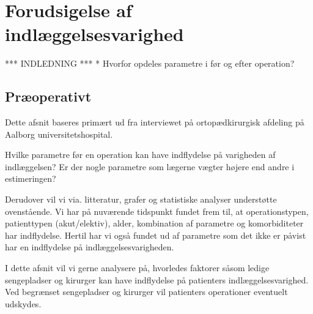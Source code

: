 \section{Forudsigelse af indlæggelsesvarighed}

*** INDLEDNING ***
* Hvorfor opdeles parametre i før og efter operation?

\subsection{Præoperativt}

Dette afsnit baseres primært ud fra interviewet på ortopædkirurgisk afdeling på Aalborg universitetshospital. 


Hvilke parametre før en operation kan have indflydelse på varigheden af indlæggelsen? Er der nogle parametre som lægerne vægter højere end andre i estimeringen? 


Derudover vil vi via. litteratur, grafer og statistiske analyser understøtte ovenstående. Vi har på nuværende tidspunkt fundet frem til, at operationstypen, patienttypen (akut/elektiv), alder,  kombination af parametre og komorbiditeter har indflydelse. Hertil har vi også fundet ud af parametre som det ikke er påvist har en indflydelse på indlæggelsesvarigheden.


I dette afsnit vil vi gerne analysere på, hvorledes faktorer såsom ledige sengepladser og kirurger kan have indflydelse på patienters indlæggelsesvarighed. Ved begrænset sengepladser og kirurger vil patienters operationer eventuelt udskydes. 

